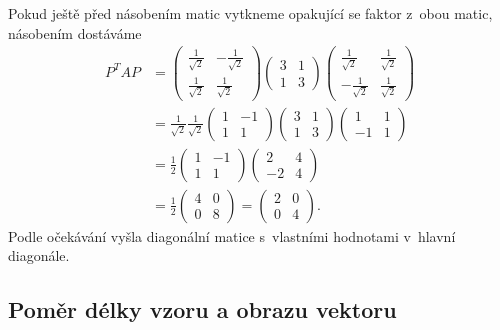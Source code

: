 Pokud ještě před násobením matic vytkneme opakující se faktor z obou matic, násobením dostáváme
\begin{equation*}
  \begin{aligned}
  P^TAP&=\begin{pmatrix}
      \frac 1{\sqrt 2} & -\frac 1{\sqrt 2}\\
      \frac {1}{\sqrt 2} & \frac 1{\sqrt 2}
    \end{pmatrix}
        \begin{pmatrix}
    3 & 1 \\ 1 &3
  \end{pmatrix}
  \begin{pmatrix}
      \frac 1{\sqrt 2} & \frac 1{\sqrt 2}\\
      -\frac {1}{\sqrt 2} & \frac 1{\sqrt 2}
    \end{pmatrix}\\&
    =\frac 1{\sqrt 2}\frac 1{\sqrt 2}
    \begin{pmatrix}
      1 & -1 \\ 1 &1
    \end{pmatrix}
        \begin{pmatrix}
    3 & 1 \\ 1 &3
  \end{pmatrix}
    \begin{pmatrix}
      1 & 1 \\ -1 &1
    \end{pmatrix}
    \\&=
    \frac 1{2}
    \begin{pmatrix}
      1 & -1 \\ 1 &1
    \end{pmatrix}
    \begin{pmatrix}
      2 & 4 \\-2 & 4
    \end{pmatrix}
    \\&=
    \frac 1{ 2}
    \begin{pmatrix}
      4& 0 \\ 0& 8
    \end{pmatrix}=
    \begin{pmatrix}
      2& 0 \\0& 4
    \end{pmatrix}.
  \end{aligned}
\end{equation*}
Podle očekávání vyšla diagonální matice s vlastními hodnotami v hlavní diagonále.
 \konec


 \subsection{Poměr délky vzoru a obrazu vektoru}

